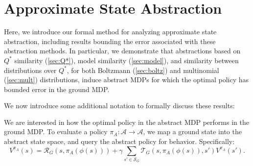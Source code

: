 \section{Approximate State Abstraction}

Here, we introduce our formal method for analyzing approximate state abstraction, including results bounding the error associated with these abstraction methods. In particular, we demonstrate that abstractions based on $Q^*$ similarity (\ref{sec:Q*}), model similarity (\ref{sec:model}), and similarity between distributions over $Q^*$, for both Boltzmann (\ref{sec:boltz}) and multinomial (\ref{sec:mult}) distributions, induce abstract \acp{MDP} for which the optimal policy has bounded error in the ground MDP.





We now introduce some additional notation to formally discuss these results:

We are interested in how the optimal policy in the abstract \ac{MDP} performs in the ground \ac{MDP}. To evaluate a policy $\pi_A:\mathcal{A}\rightarrow\mathcal{A}$, we map a ground state into the abstract state space, and query the abstract policy for behavior. Specifically:
\begin{equation}
V^{\pi_A}(s) = \mathcal{R}_G(s,\pi_A(\phi(s))) + \gamma \sum_{s' \in \mathcal{S}_G} \mathcal{T}_G(s,\pi_A(\phi(s)),s')V^{\pi_A}(s').
\end{equation}

